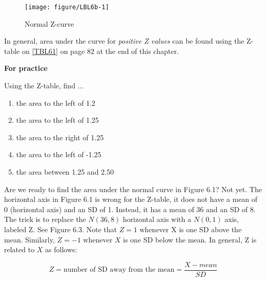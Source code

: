\documentclass[11pt, chapterprefix=true]{scrbook}\usepackage[]{graphicx}\usepackage[]{color}
\begin{document}
\begin{figure}[ht]
\caption{Normal Z-curve}



{\centering \texttt{[image: figure/LBL6b-1]} 

}



\end{figure}

In general, area under the curve for \textit{positive Z values} can be found using the Z-table on \ref{TBL61} on page 82 at the end of this chapter.  


\begin{minipage}[ht]{3cm}

\textbf{For practice}
\end{minipage}
\begin{minipage}[ht]{6cm}

\parbox{6cm}{
  Using the Z-table, find $\dots$

  \begin{enumerate}
  \item the area to the left of 1.2
  \item the area to the left of 1.25
  \item the area to the right of 1.25
  \item the area to the left of -1.25
  \item the area between 1.25 and 2.50
  \end{enumerate}
}
\end{minipage}

Are we ready to find the area under the normal curve in Figure 6.1?  Not yet.  The horizontal axis in Figure 6.1 is wrong for the Z-table, it does not have a mean of 0 (horizontal axis) and an SD of 1. Instead, it has a mean of 36 and an SD of 8.  The trick is to replace the $N(36, 8)$ horizontal axis with a $N(0, 1)$ axis, labeled Z.  See Figure 6.3.  Note that $Z = 1$ whenever X is one SD above the mean.  Similarly, $Z = -1$ whenever $X$ is one SD below the mean.  In general, Z is related to $X$ as follows:

  \begin{equation} Z = \text{number of SD away from the mean} = \frac{X - mean}{SD} \end{equation}
\end{document}
